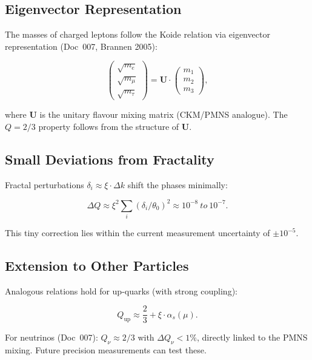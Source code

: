 	\subsection*{Eigenvector Representation}
	
	The masses of charged leptons follow the Koide relation via eigenvector representation (Doc~007, Brannen 2005):
	
	\begin{equation}
		\begin{pmatrix}
			\sqrt{m_e} \\
			\sqrt{m_\mu} \\
			\sqrt{m_\tau}
		\end{pmatrix}
		= \mathbf{U} \cdot \begin{pmatrix}
			m_1 \\
			m_2 \\
			m_3
		\end{pmatrix},
	\end{equation}
	
	where \(\mathbf{U}\) is the unitary flavour mixing matrix (CKM/PMNS analogue). The \(Q = 2/3\) property follows from the structure of \(\mathbf{U}\).
	
	\subsection*{Small Deviations from Fractality}
	
	Fractal perturbations \(\delta_i \approx \xi \cdot \Delta k\) shift the phases minimally:
	
	\begin{equation}
		\Delta Q \approx \xi^2 \sum_i (\delta_i / \theta_0)^2 \approx 10^{-8} \ to \ 10^{-7}.
	\end{equation}
	
	This tiny correction lies within the current measurement uncertainty of \(\pm 10^{-5}\).
	
	\subsection*{Extension to Other Particles}
	
	Analogous relations hold for up-quarks (with strong coupling):
	
	\begin{equation}
		Q_{\text{up}} \approx \frac{2}{3} + \xi \cdot \alpha_s(\mu).
	\end{equation}
	
	For neutrinos (Doc~007): \(Q_\nu \approx 2/3\) with \(\Delta Q_\nu < 1\%\), directly linked to the PMNS mixing. Future precision measurements can test these.
	
